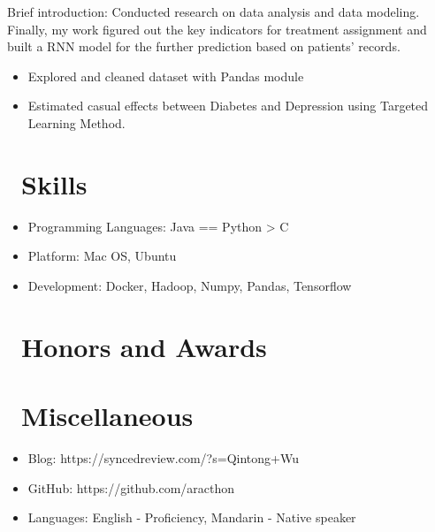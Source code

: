 \documentclass{resume}
\begin{document}
Brief introduction: Conducted research on data analysis and data modeling. Finally, my work figured out the key indicators for treatment assignment and built a RNN model for the further prediction based on patients' records.
\begin{itemize}
  \item Explored and cleaned dataset with Pandas module
  \item Estimated casual effects between Diabetes and Depression using Targeted Learning Method.
\end{itemize}


\section{\faCogs\ Skills}
\begin{itemize}[parsep=0.5ex]
  \item Programming Languages: Java == Python > C
  \item Platform: Mac OS, Ubuntu
  \item Development: Docker, Hadoop, Numpy, Pandas, Tensorflow
\end{itemize}

\section{\faHeartO\ Honors and Awards}

\section{\faInfo\ Miscellaneous}
\begin{itemize}[parsep=0.5ex]
  \item Blog: https://syncedreview.com/?s=Qintong+Wu
  \item GitHub: https://github.com/aracthon
  \item Languages: English - Proficiency, Mandarin - Native speaker
\end{itemize}

%
%
\end{document}
